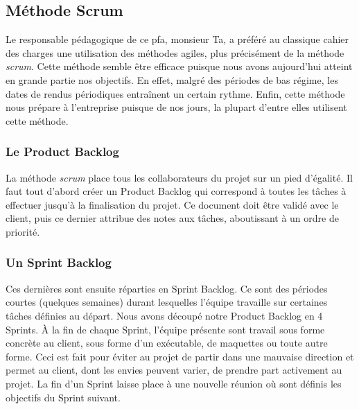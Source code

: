 \subsection{Méthode Scrum}
Le responsable pédagogique de ce pfa, monsieur Ta, a préféré au classique cahier des charges une utilisation des méthodes agiles, plus précisément de la méthode \textit{scrum}.  Cette méthode semble être efficace puisque nous avons aujourd'hui atteint en grande partie nos objectifs. En effet, malgré des périodes de bas régime, les dates de rendus périodiques entraînent un certain rythme. Enfin, cette méthode nous prépare à l'entreprise puisque de nos jours, la plupart d'entre elles utilisent cette méthode.



\subsubsection*{Le Product Backlog}
La méthode \textit{scrum} place tous les collaborateurs du projet sur un pied d'égalité. Il faut tout d'abord créer un Product Backlog qui correspond à toutes les tâches à effectuer jusqu'à la finalisation du projet.
Ce document doit être validé avec le client, puis ce dernier attribue des notes aux tâches, aboutissant à un ordre de priorité.

\subsubsection*{Un Sprint Backlog}
Ces dernières sont ensuite réparties en Sprint Backlog. Ce sont des périodes courtes (quelques semaines) durant lesquelles l'équipe travaille sur certaines tâches définies au départ. Nous avons découpé notre Product Backlog en 4 Sprints.
À la fin de chaque Sprint, l'équipe présente sont travail sous forme concrète au client, sous forme d'un exécutable, de maquettes ou toute autre forme.
Ceci est fait pour éviter au projet de partir dans une mauvaise direction et permet au client, dont les envies peuvent varier, de prendre part activement au projet.
La fin d'un Sprint laisse place à une nouvelle réunion où sont définis les objectifs du Sprint suivant.

